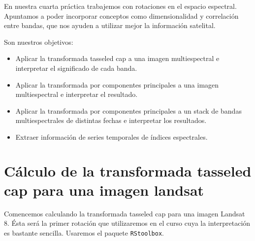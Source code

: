 En nuestra cuarta pr\'actica trabajemos con rotaciones en el espacio espectral.
Apuntamos a poder incorporar conceptos como dimensionalidad y
correlaci\'on entre bandas, que nos ayuden a utilizar mejor la informaci\'on
satelital.

Son nuestros objetivos:

\begin{itemize}
    \item Aplicar la transformada tasseled cap a una imagen multiespectral e
        interpretar el significado de cada banda.
    \item Aplicar la transformada por componentes principales a una imagen
        multiespectral e interpretar el resultado.
    \item Aplicar la transformada por componentes principales a un stack
        de bandas multiespectrales de distintas fechas e interpretar los resultados.
    \item Extraer informaci\'on de series temporales de \'indices espectrales.
\end{itemize}

\section{C\'alculo de la transformada tasseled cap para una imagen landsat}

Comencemos calculando la transformada tasseled cap para una imagen Landsat 8. \'Esta
ser\'a la primer rotaci\'on que utilizaremos en el curso cuya la
interpretaci\'on es bastante sencilla. Usaremos el paquete
\texttt{RStoolbox}.

